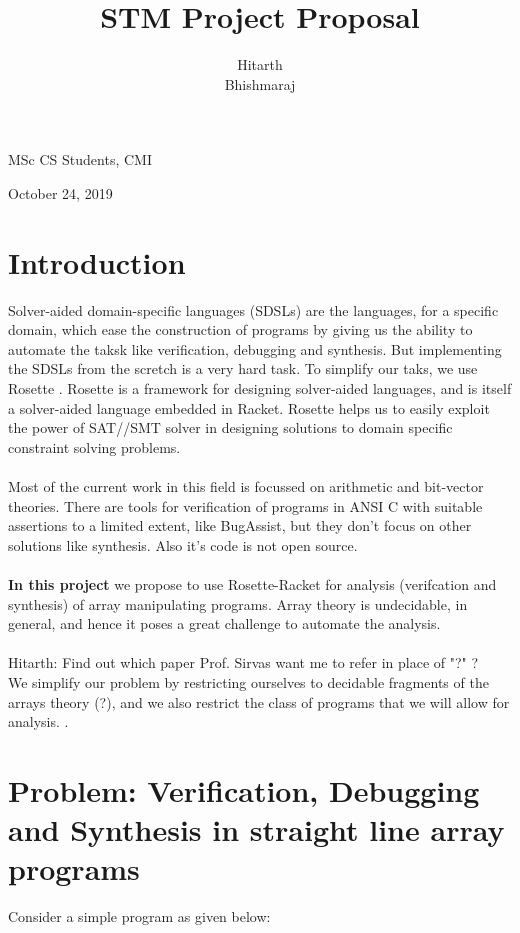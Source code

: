 \documentclass[a4paper, 12pt, notitlepage] {article}
\author{Hitarth \\ Bhishmaraj}
\title{STM Project Proposal}
\date{} %
\newcommand{\hcmt}[1]{{\color{magenta} \tiny{Hitarth: {#1}}}}
\begin{document}
\maketitle		


\begin{center}
MSc CS Students, CMI
\end{center}
\begin{center}
October 24, 2019
\end{center}
\newpage

\section{Introduction}

Solver-aided domain-specific languages (SDSLs) are the languages, for a specific domain, which ease the construction of programs by giving us the ability to automate the taksk like verification, debugging and synthesis. But implementing the SDSLs from the scretch is a very hard task. To simplify our taks, we use Rosette \cite{rosette_paper}. Rosette is a framework for designing solver-aided languages, and is itself a solver-aided language embedded in Racket. Rosette helps us to easily exploit the power of SAT//SMT solver in designing solutions to domain specific constraint solving problems.\\
\\
Most of the current work in this field is focussed on arithmetic and bit-vector theories. There are tools for verification of programs in ANSI C with suitable assertions to  a limited extent, like BugAssist\cite{bugassist}, but they don't focus on other solutions like synthesis. Also it's code is not open source.\\
 \\
{\bf In this project} we propose to use Rosette-Racket for analysis (verifcation and synthesis) of array manipulating programs. Array theory is undecidable, in general, and hence it poses a great challenge to automate the analysis.\\\\
\hcmt{Find out which paper Prof. Sirvas want me to refer in place of "?" ? }\\
We simplify our problem by restricting ourselves to decidable fragments of the arrays theory (?), and we also restrict the class of programs that we will allow for analysis. .

\section {Problem: Verification, Debugging and Synthesis in straight line array programs}
Consider a simple program as given below:
\end{document}
